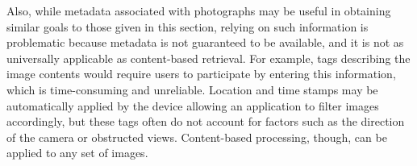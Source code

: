 
Also, while metadata associated with photographs may be useful in obtaining similar goals to those given in this section, relying on such information is problematic because metadata is not guaranteed to be available, and it is not as universally applicable as content-based retrieval.  For example, tags describing the image contents would require users to participate by entering this information, which is time-consuming and unreliable.  Location and time stamps may be automatically applied by the device allowing an application to filter images accordingly, but these tags often do not account for factors such as the direction of the camera or obstructed views.  Content-based processing, though, can be applied to any set of images.



